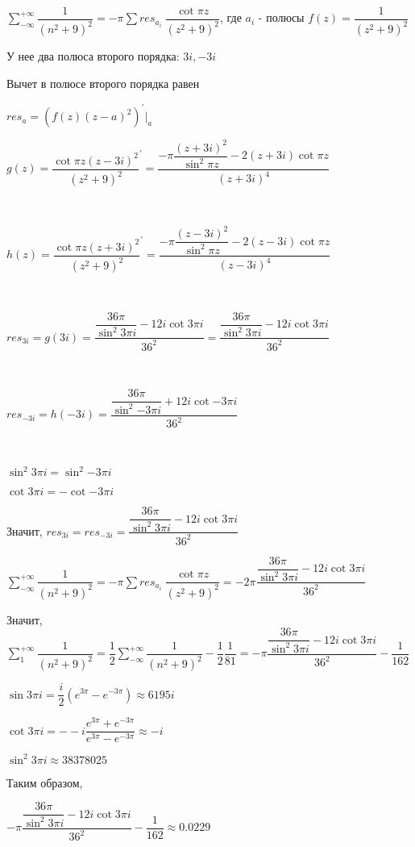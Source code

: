 \documentclass{article}
\begin{document}
$\sum\limits_{-\infty}^{+\infty}{\dfrac{1}{(n^2 + 9)^2}} = -\pi \sum{res_{a_i} \: \dfrac{\cot{\pi z}}{(z^2 + 9)^2}}$, где $a_i$ - полюсы $f(z) = \dfrac{1}{(z^2 + 9)^2}$

У нее два полюса второго порядка: $3i, -3i$

Вычет в полюсе второго порядка равен

$res_a = (f(z)(z - a)^2)^{\prime}|_a$

$g(z) = \dfrac{\cot{\pi z}(z - 3i)^2}{(z^2 + 9)^2}^{\prime} = \dfrac{-\pi \dfrac{(z + 3i)^2}{\sin^2{\pi z}} - 2(z + 3i) \cot{\pi z} }{(z + 3i)^4}$

~\

$h(z) = \dfrac{\cot{\pi z}(z + 3i)^2}{(z^2 + 9)^2}^{\prime} = \dfrac{-\pi \dfrac{(z - 3i)^2}{\sin^2{\pi z}} - 2(z - 3i) \cot{\pi z} }{(z - 3i)^4}$

~\

$res_{3i} = g(3i) = \dfrac{\dfrac{36 \pi}{\sin^2{3 \pi i}} - 12 i \cot{3 \pi i} }{36^2} = \dfrac{\dfrac{36 \pi}{\sin^2{3 \pi i}} - 12 i \cot{3 \pi i} }{36^2}$

~\

$res_{-3i} = h(-3i) = \dfrac{\dfrac{36 \pi}{\sin^2{- 3 \pi i}} + 12 i \cot{-3 \pi i} }{36^2}$

~\

$\sin^2{3 \pi i} = \sin^2{-3 \pi i}$

$\cot{3 \pi i} = - \cot{-3 \pi i}$

Значит, $res_{3i} = res_{-3i} = \dfrac{\dfrac{36 \pi}{\sin^2{3 \pi i}} - 12 i \cot{3 \pi i} }{36^2}$

$\sum\limits_{-\infty}^{+\infty}{\dfrac{1}{(n^2 + 9)^2}} = -\pi \sum{res_{a_i} \: \dfrac{\cot{\pi z}}{(z^2 + 9)^2}} = -2 \pi \dfrac{\dfrac{36 \pi}{\sin^2{3 \pi i}} - 12 i \cot{3 \pi i} }{36^2}$

Значит, $\sum\limits_{1}^{+\infty}{\dfrac{1}{(n^2 + 9)^2}} = \dfrac{1}{2}\sum\limits_{-\infty}^{+\infty}{\dfrac{1}{(n^2 + 9)^2}} - \dfrac{1}{2} \dfrac{1}{81} = -\pi \dfrac{\dfrac{36 \pi}{\sin^2{3 \pi i}} - 12 i \cot{3 \pi i} }{36^2} - \dfrac{1}{162}$

$\sin{3 \pi i} = \dfrac{i}{2}(e^{3 \pi} - e^{-3 \pi}) \approx 6195i$

$\cot{3 \pi i} = --i\dfrac{e^{3 \pi} + e^{-3 \pi}}{e^{3 \pi} - e^{-3 \pi}} \approx -i$

$\sin^2{3 \pi i} \approx 38378025$ 

Таким образом,

$-\pi \dfrac{\dfrac{36 \pi}{\sin^2{3 \pi i}} - 12 i \cot{3 \pi i} }{36^2} - \dfrac{1}{162} \approx 0.0229$
\end{document}
